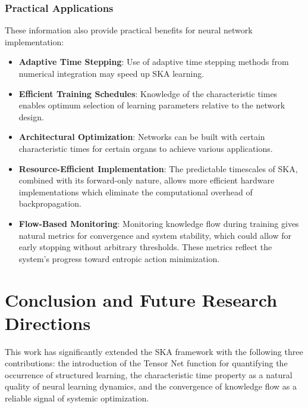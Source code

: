 \documentclass{article}
\begin{document}
	
	
	\subsubsection{Practical Applications}
These information also provide practical benefits for neural network implementation:
	
    \begin{itemize}

    \item \textbf{Adaptive Time Stepping}: Use of adaptive time stepping methods from numerical integration may speed up SKA learning.

		\item \textbf{Efficient Training Schedules}: Knowledge of the characteristic times enables optimum selection of learning parameters relative to the network design.  

		\item \textbf{Architectural Optimization}: Networks can be built with certain characteristic times for certain organs to achieve various applications.

        \item \textbf{Resource-Efficient Implementation}: The predictable timescales of SKA, combined with its forward-only nature, allows more efficient hardware implementations which eliminate the computational overhead of backpropagation.

		\item \textbf{Flow-Based Monitoring}: Monitoring knowledge flow during training gives natural metrics for convergence and system stability, which could allow for early stopping without arbitrary thresholds. These metrics reflect the system's progress toward entropic action minimization.

		

	\end{itemize}
	

\section{Conclusion and Future Research Directions}
This work has significantly extended the SKA framework with the following three contributions: the introduction of the Tensor Net function for quantifying the occurrence of structured learning, the characteristic time property as a natural quality of neural learning dynamics, and the convergence of knowledge flow as a reliable signal of systemic optimization. 
\end{document}
